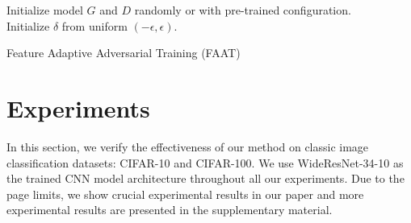 \documentclass[10pt,twocolumn,letterpaper]{article}
\begin{document}
	\begin{algorithm}[!t]
		Initialize model $G$ and $D$ randomly or with pre-trained configuration. \\
		Initialize $\delta$ from uniform $(-\epsilon, \epsilon)$.  \\
		\caption{Feature Adaptive Adversarial Training (FAAT)}
		\label{trianing}
		
	\end{algorithm}
\section{Experiments}
In this section, we verify the effectiveness of our method on classic image classification datasets: CIFAR-10 and CIFAR-100. We use WideResNet-34-10 as the trained CNN model architecture throughout all our experiments. Due to the page limits, we show crucial experimental results in our paper and more experimental results are presented in the supplementary material.
\end{document}
